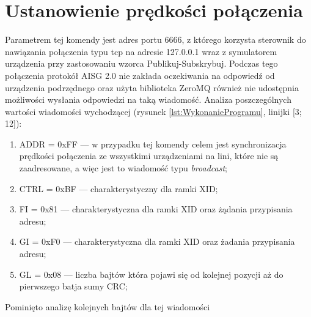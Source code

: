     \section{Ustanowienie prędkości połączenia}
    Parametrem tej komendy jest adres portu 6666, z którego korzysta sterownik do nawiązania połączenia typu tcp na adresie 127.0.0.1 wraz z symulatorem urządzenia
    przy zastosowaniu wzorca Publikuj-Subskrybuj. Podczas tego połączenia protokół AISG 2.0 nie zakłada oczekiwania na odpowiedź od urządzenia podrzędnego oraz użyta biblioteka
    ZeroMQ również nie udostępnia możliwości wysłania odpowiedzi na taką wiadomość.
    \newline
	Analiza poszczególnych wartości wiadomości wychodzącej (rysunek \ref{lst:WykonanieProgramu}, linijki [3; 12]):
	\begin{enumerate}
        \item ADDR = 0xFF --- w przypadku tej komendy celem jest synchronizacja prędkości połączenia ze wszystkimi urządzeniami na lini, 
        które nie są zaadresowane, a więc jest to wiadomość typu \textit{broadcast};
        \item CTRL = 0xBF --- charakterystyczny dla ramki XID;
        \item FI = 0x81 --- charakterystyczna dla ramki XID oraz żądania przypisania adresu;
        \item GI = 0xF0 --- charakterystyczna dla ramki XID oraz żadania przypisania adresu;
        \item GL = 0x08 --- liczba bajtów która pojawi się od kolejnej pozycji aż do pierwszego batja sumy CRC;
    \end{enumerate}
    Pominięto analizę kolejnych bajtów dla tej wiadomości %
